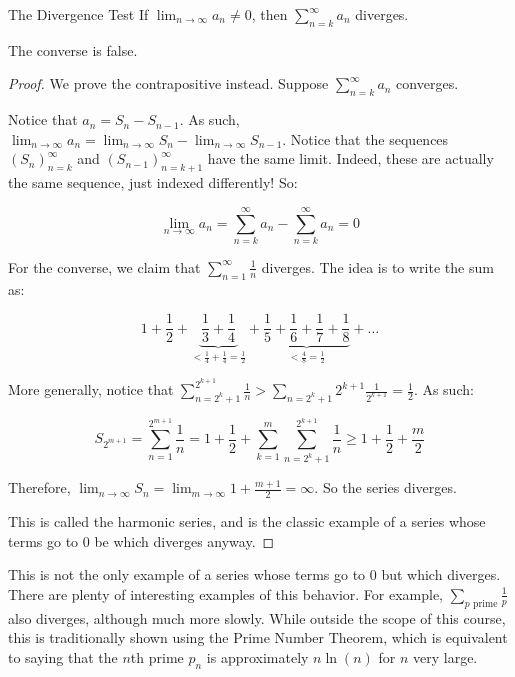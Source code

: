 \begin{thmbo}{The Divergence Test}{} If $\lim_{n\rightarrow \infty} a_n \ne 0$, then $\sum_{n = k}^\infty a_n$ diverges.

The converse is false.
\end{thmbo}
\begin{proof} We prove the contrapositive instead. Suppose $\sum_{n = k}^\infty a_n$ converges.

Notice that $a_n = S_n - S_{n-1}$. As such, $\lim_{n\rightarrow \infty} a_n = \lim_{n\rightarrow \infty} S_n - \lim_{n\rightarrow \infty} S_{n-1}$. Notice that the sequences $(S_n)_{n = k}^\infty$ and $(S_{n-1})_{n = k+1}^\infty$ have the same limit. Indeed, these are actually the same sequence, just indexed differently! So: 

$$\lim_{n\rightarrow \infty} a_n = \sum_{n = k}^\infty a_n - \sum_{n = k}^\infty a_n = 0$$

For the converse, we claim that $\sum_{n = 1}^\infty \frac{1}{n}$ diverges. The idea is to write the sum as:

$$1 + \frac{1}{2} + \underbrace{\frac{1}{3} + \frac{1}{4}}_{< \frac{1}{4} + \frac{1}{4} = \frac{1}{2}} + \underbrace{ \frac{1}{5} + \frac{1}{6} + \frac{1}{7} + \frac{1}{8}}_{< \frac{4}{8} = \frac{1}{2}} + \dots$$

More generally, notice that $\sum_{n = 2^k + 1}^{2^{k+1}} \frac{1}{n} > \sum_{n = 2^k + 1}{2^{k+1}} \frac{1}{2^{k+1}} = \frac{1}{2}$. As such:

$$S_{2^{m+1}} = \sum_{n = 1}^{2^{m+1}} \frac{1}{n} =1 + \frac{1}{2} +  \sum_{k = 1}^m \sum_{n = 2^k + 1}^{2^{k+1}} \frac{1}{n} \ge 1 + \frac{1}{2} + \frac{m}{2}$$

Therefore, $\lim_{n\rightarrow \infty} S_n = \lim_{m\rightarrow \infty} 1 + \frac{m+1}{2} = \infty$. So the series diverges.

This is called the harmonic series, and is the classic example of a series whose terms go to $0$ be which diverges anyway.
\end{proof}

This is not the only example of a series whose terms go to $0$ but which diverges. There are plenty of interesting examples of this behavior. For example, $\displaystyle\sum_{p \text{ prime}} \frac{1}{p}$ also diverges, although much more slowly. While outside the scope of this course, this is traditionally shown using the Prime Number Theorem, which is equivalent to saying that the $n$th prime $p_n$ is approximately $n\ln(n)$ for $n$ very large.


